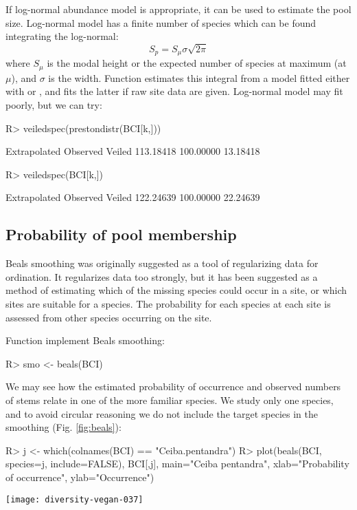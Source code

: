 \documentclass[article,nojss]{jss}
\begin{document}
If log-normal abundance model is appropriate, it can be used to
estimate the pool size.  Log-normal model has a finite number of
species which can be found integrating the log-normal:
\begin{equation}
S_p = S_\mu \sigma \sqrt{2 \pi}
\end{equation}
where $S_\mu$ is the modal height or the expected number of species at
maximum (at $\mu$), and $\sigma$ is the width.  Function
 estimates this integral from a model fitted either
with  or , and fits the latter
if raw site data are given.  Log-normal model may fit poorly, but we
can try:
\begin{Schunk}
\begin{Sinput}
R> veiledspec(prestondistr(BCI[k,]))
\end{Sinput}
\begin{Soutput}
Extrapolated     Observed       Veiled 
   113.18418    100.00000     13.18418 
\end{Soutput}
\begin{Sinput}
R> veiledspec(BCI[k,])
\end{Sinput}
\begin{Soutput}
Extrapolated     Observed       Veiled 
   122.24639    100.00000     22.24639 
\end{Soutput}
\end{Schunk}

\subsection{Probability of pool membership}

Beals smoothing was originally suggested as a tool of regularizing data
for ordination.  It regularizes data too strongly,
but it has been suggested as a method of estimating which of the
missing species could occur in a site, or which sites are suitable for
a species.  The probability for each species at each site is assessed
from other species occurring on the site.

Function  implement Beals smoothing:
\begin{Schunk}
\begin{Sinput}
R> smo <- beals(BCI)
\end{Sinput}
\end{Schunk}
We may see how the estimated probability of occurrence and observed
numbers of stems relate in one of the more familiar species. We study
only one species, and to avoid circular reasoning we do not include
the target species in the smoothing (Fig. \ref{fig:beals}):
\begin{Schunk}
\begin{Sinput}
R> j <- which(colnames(BCI) == "Ceiba.pentandra")
R> plot(beals(BCI, species=j, include=FALSE), BCI[,j], main="Ceiba pentandra", xlab="Probability of occurrence", ylab="Occurrence")
\end{Sinput}
\end{Schunk}
\begin{SCfigure}
\texttt{[image: diversity-vegan-037]}
\caption{Beals smoothing for \emph{Ceiba pentandra}.}
\label{fig:beals}
\end{SCfigure}
\end{document}
